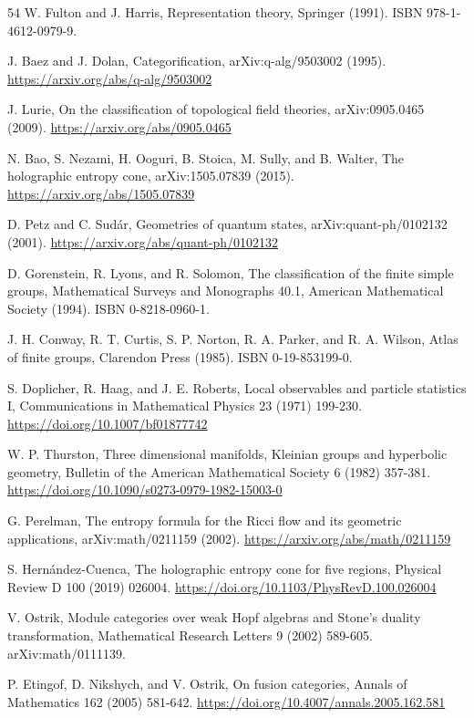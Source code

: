 \documentclass[11pt,letterpaper]{article}
\theoremstyle{definition}
\theoremstyle{remark}
\begin{document}
\begin{thebibliography}{54}
 W. Fulton and J. Harris, Representation theory, Springer (1991). ISBN 978-1-4612-0979-9.

 J. Baez and J. Dolan, Categorification, arXiv:q-alg/9503002 (1995). \url{https://arxiv.org/abs/q-alg/9503002}

 J. Lurie, On the classification of topological field theories, arXiv:0905.0465 (2009). \url{https://arxiv.org/abs/0905.0465}

 N. Bao, S. Nezami, H. Ooguri, B. Stoica, M. Sully, and B. Walter, The holographic entropy cone, arXiv:1505.07839 (2015). \url{https://arxiv.org/abs/1505.07839}

 D. Petz and C. Sud\'ar, Geometries of quantum states, arXiv:quant-ph/0102132 (2001). \url{https://arxiv.org/abs/quant-ph/0102132}

 D. Gorenstein, R. Lyons, and R. Solomon, The classification of the finite simple groups, Mathematical Surveys and Monographs 40.1, American Mathematical Society (1994). ISBN 0-8218-0960-1.

 J. H. Conway, R. T. Curtis, S. P. Norton, R. A. Parker, and R. A. Wilson, Atlas of finite groups, Clarendon Press (1985). ISBN 0-19-853199-0.

 S. Doplicher, R. Haag, and J. E. Roberts, Local observables and particle statistics I, Communications in Mathematical Physics 23 (1971) 199-230. \url{https://doi.org/10.1007/bf01877742}

 W. P. Thurston, Three dimensional manifolds, Kleinian groups and hyperbolic geometry, Bulletin of the American Mathematical Society 6 (1982) 357-381. \url{https://doi.org/10.1090/s0273-0979-1982-15003-0}

 G. Perelman, The entropy formula for the Ricci flow and its geometric applications, arXiv:math/0211159 (2002). \url{https://arxiv.org/abs/math/0211159}

 S. Hern\'andez-Cuenca, The holographic entropy cone for five regions, Physical Review D 100 (2019) 026004. \url{https://doi.org/10.1103/PhysRevD.100.026004}

 V. Ostrik, Module categories over weak Hopf algebras and Stone's duality transformation, Mathematical Research Letters 9 (2002) 589-605. arXiv:math/0111139.

 P. Etingof, D. Nikshych, and V. Ostrik, On fusion categories, Annals of Mathematics 162 (2005) 581-642. \url{https://doi.org/10.4007/annals.2005.162.581}


\end{thebibliography}
\end{document}
